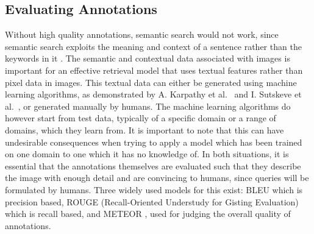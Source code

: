 \documentclass[12pt,a4paper]{article}
\begin{document}
\subsection{Evaluating Annotations}

Without high quality annotations, semantic search would not work, since semantic search exploits the meaning and context of a sentence rather than the keywords in it \cite{ali2010semantically}. The semantic and contextual data associated with images is important for an effective retrieval model that uses textual features rather than pixel data in images. This textual data can either be generated using machine learning algorithms, as demonstrated by A. Karpathy et al.~\cite{karpathy2015deep} and  I. Sutskeve et al.~\cite{sutskever2011generating}, or generated manually by humans. The machine learning algorithms do however start from test data, typically of a specific domain or a range of domains, which they learn from. It is important to note that this can have undesirable consequences when trying to apply a model which has been trained on one domain to one which it has no knowledge of. In both situations, it is essential that the annotations themselves are evaluated such that they describe the image with enough detail and are convincing to humans, since queries will be formulated by humans. Three widely used models for this exist: BLEU \citep{papineni2002bleu} which is precision based, ROUGE (Recall-Oriented Understudy for Gisting Evaluation) \citep{lin2004rouge} which is recall based, and METEOR \citep{elliott2013image}, used for judging the overall quality of annotations.
\end{document}
